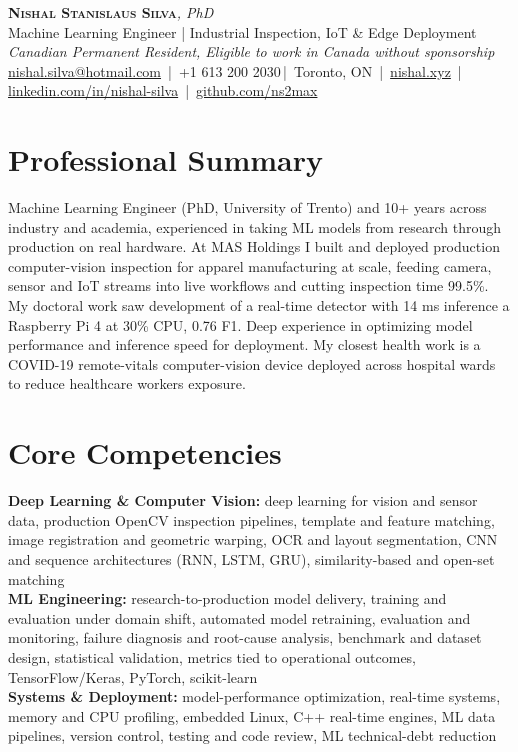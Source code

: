 \documentclass[11pt]{article}
\makeatletter
\newcommand{\cvName}{Nishal Stanislaus Silva}
\newcommand{\cvEmail}{nishal.silva@hotmail.com}
\newcommand{\cvPhone}{+1 613 200 2030}
\newcommand{\cvCity}{Toronto, ON}
\newcommand{\cvSite}{https://nishal.xyz}
\newcommand{\cvLinkedIn}{https://www.linkedin.com/in/nishal-silva}
\newcommand{\cvGitHub}{https://github.com/ns2max}
\newcommand{\cvStatus}{Canadian Permanent Resident, Eligible to work in Canada without sponsorship}
\newcommand{\cvTagline}{Machine Learning Engineer | Industrial Inspection, IoT \& Edge Deployment}
\makeatother
\begin{document}
\pagestyle{empty}
\begin{center}
    {\LARGE \scshape \textbf{\cvName}}{\large \textit{, PhD}}\\[1pt]
    {\small \cvTagline}\\[1pt]
    {\footnotesize\textit{\cvStatus}}\\[1pt]
    {\small
    \href{mailto:\cvEmail}{\cvEmail} \,|\, \cvPhone \,|\, \cvCity
    \,|\, \href{\cvSite}{nishal.xyz} \,|\, \href{\cvLinkedIn}{linkedin.com/in/nishal-silva}
    \,|\, \href{\cvGitHub}{github.com/ns2max}}
\end{center}

\section*{Professional Summary}

Machine Learning Engineer (PhD, University of Trento) and 10+ years across industry and academia, experienced in taking ML models from research through production on real hardware. At MAS Holdings I built and deployed production computer-vision inspection for apparel manufacturing at scale, feeding camera, sensor and IoT streams into live workflows and cutting inspection time 99.5\%. My doctoral work saw development of a real-time detector with 14 ms  inference a Raspberry Pi 4 at 30\% CPU, 0.76 F1. Deep experience in optimizing model performance and inference speed for deployment. My closest health work is a COVID-19 remote-vitals computer-vision device deployed across hospital wards to reduce healthcare workers exposure.

\section*{Core Competencies}

\textbf{Deep Learning \& Computer Vision:} deep learning for vision and sensor data, production OpenCV inspection pipelines, template and feature matching, image registration and geometric warping, OCR and layout segmentation, CNN and sequence architectures (RNN, LSTM, GRU), similarity-based and open-set matching\\
\textbf{ML Engineering:} research-to-production model delivery, training and evaluation under domain shift, automated model retraining, evaluation and monitoring, failure diagnosis and root-cause analysis, benchmark and dataset design, statistical validation, metrics tied to operational outcomes, TensorFlow/Keras, PyTorch, scikit-learn\\
\textbf{Systems \& Deployment:} model-performance optimization, real-time systems, memory and CPU profiling, embedded Linux, C++ real-time engines, ML data pipelines, version control, testing and code review, ML technical-debt reduction
\end{document}
